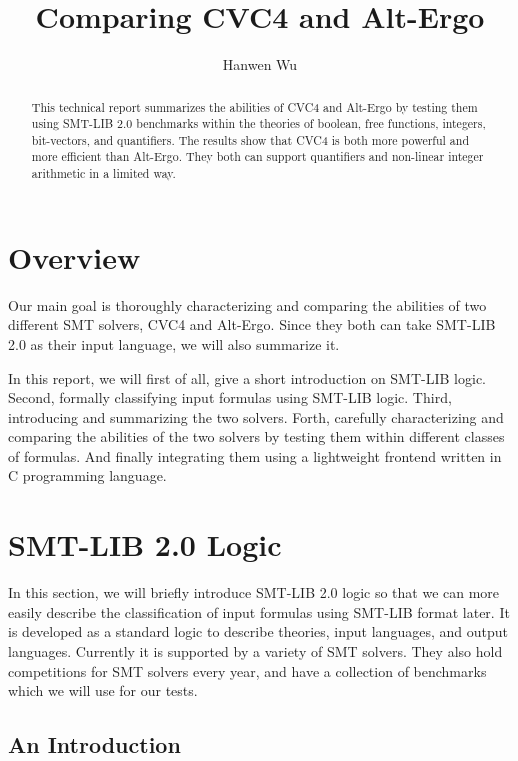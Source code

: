 \documentclass[10pt,twocolumn,letter]{article}
\title{\bf Comparing CVC4 and Alt-Ergo}
\author{Hanwen Wu}
\affil{ Department of Computer Science\\Boston University\\ \small\texttt{hwwu@bu.edu}}
\theoremstyle{definition}
\begin{document}
\maketitle

\begin{abstract}
This technical report summarizes the abilities of CVC4 and Alt-Ergo by testing them using SMT-LIB 2.0 benchmarks within the theories of boolean, free functions, integers, bit-vectors, and quantifiers. The results show that CVC4 is both more powerful and more efficient than Alt-Ergo. They both can support quantifiers and non-linear integer arithmetic in a limited way.
\end{abstract}
\section{Overview}

Our main goal is thoroughly characterizing and comparing the abilities of two different SMT solvers, CVC4\cite{barrett:cvc4:2011} and Alt-Ergo\cite{alt-ergo}. Since they both can take SMT-LIB 2.0\cite{bs2010} as their input language, we will also summarize it.

In this report, we will first of all, give a short introduction on SMT-LIB logic. Second, formally classifying input formulas using SMT-LIB logic. Third, introducing and summarizing the two solvers. Forth, carefully characterizing and comparing the abilities of the two solvers by testing them within different classes of formulas. And finally integrating them using a lightweight frontend written in C programming language.

\section{SMT-LIB 2.0 Logic}

In this section, we will briefly introduce SMT-LIB 2.0 logic so that we can more easily describe the classification of input formulas using SMT-LIB format later. It is developed as a standard logic to describe theories, input languages, and output languages. Currently it is supported by a variety of SMT solvers. They also hold competitions for SMT solvers every year, and have a collection of benchmarks which we will use for our tests.

\subsection{An Introduction}
\end{document}
